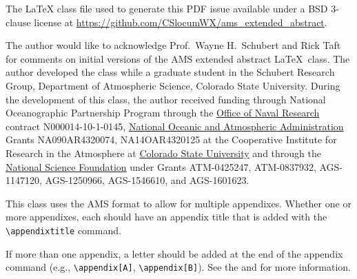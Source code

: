 \documentclass[9pt, blue]{ametsocextabs}
\begin{document}
%
\datastatement The LaTeX class file used to generate this PDF issue
available under a BSD 3-clause license at
\url{https://github.com/CSlocumWX/ams_extended_abstract}.

%
\acknowledgments
The author would like to acknowledge Prof.\ Wayne H.\ Schubert and
Rick Taft for comments on initial versions of the AMS extended
abstract \LaTeX\ class. The author developed the class while a
graduate student in the Schubert Research Group,
Department of Atmospheric Science, Colorado State University. During
the development of this class, the author received funding through
National Oceanographic Partnership Program through the
\href{https://ror.org/00rk2pe57}{Office of Naval Research}
contract N000014-10-1-0145,
\href{https://ror.org/02z5nhe81}{National Oceanic and Atmospheric Administration}
Grants NA090AR4320074, NA14OAR4320125 at the Cooperative Institute
for Research in the Atmosphere at
\href{https://ror.org/03k1gpj17}{Colorado State University}
and through the \href{https://ror.org/021nxhr62}{National Science Foundation}
under Grants ATM-0425247, ATM-0837932, AGS-1147120, AGS-1250966,
AGS-1546610, and AGS-1601623.

\appendix
{}
This class uses the AMS format to allow for multiple appendixes.
Whether one or more appendixes, each should have an appendix title
that is added with the \texttt{\textbackslash appendixtitle}
command.

If more than one appendix, a letter should be added at the end of
the appendix command (e.g., \texttt{\textbackslash appendix[A]},
\texttt{\textbackslash appendix[B]}). See the \citet{AMS2025latex}
and \citet{AMS2025doc} for more information.



\end{document}
